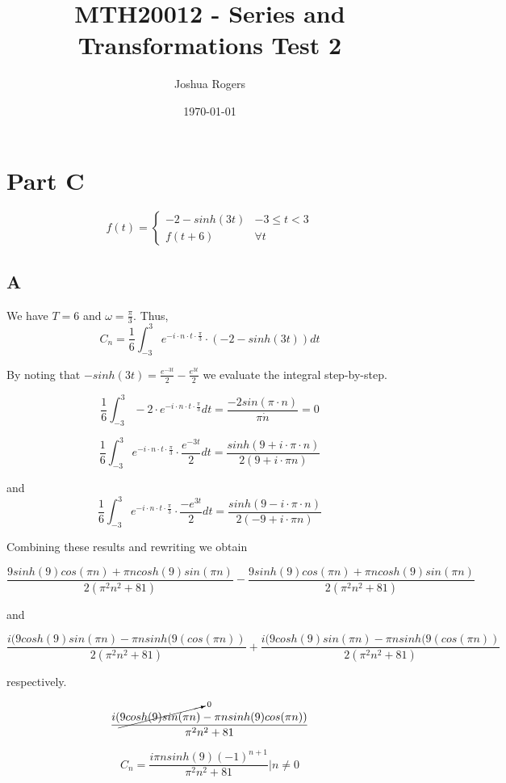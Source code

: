 \documentclass{article}
\title{\vspace{-4cm}MTH20012 - Series and Transformations Test 2}
\author{Joshua Rogers}
\date\today
\begin{document}
\maketitle 

\section*{Part C}


\[ f(t) = \begin{cases}
      -2 - sinh(3t) & -3\leq t < 3 \\
      f(t+6) & \forall t
   \end{cases}
\]


\subsection*{A}

We have $T=6$ and $\omega = \frac{\pi}{3}$. Thus,
$$C_n = \frac{1}{6} \int_{-3}^{3} e^{-i \cdot n \cdot t \cdot \frac{\pi}{3}} \cdot \left(-2-sinh(3t)\right) dt$$

By noting that $-sinh(3t) = \frac{e^{-3t}}{2} - \frac{e^{3t}}{2}$ we evaluate the integral step-by-step.

$$
\frac{1}{6} \int_{-3}^{3} -2 \cdot e^{-i \cdot n \cdot t \cdot \frac{\pi}{3}} dt = \frac{-2sin(\pi \cdot n)}{\pi \dot n} = 0
$$

$$
\frac{1}{6} \int_{-3}^{3}  e^{-i \cdot n \cdot t \cdot \frac{\pi}{3}} \cdot \frac{e^{-3t}}{2} dt = \frac{sinh(9+i\cdot \pi \cdot n)}{2(9 + i\cdot \pi n)}
$$

and
$$
\frac{1}{6} \int_{-3}^{3}  e^{-i \cdot n \cdot t \cdot \frac{\pi}{3}} \cdot \frac{-e^{3t}}{2} dt = \frac{sinh(9-i\cdot \pi \cdot n)}{2(-9 + i\cdot \pi n)}
$$

Combining these results and rewriting we obtain

$$
\frac{9sinh(9)cos(\pi n)+\pi n cosh(9) sin(\pi n)}{2(\pi^2n^2+81)} - \frac{9sinh(9)cos(\pi n)+\pi n cosh(9) sin(\pi n)}{2(\pi^2n^2+81)}
$$

and

$$
\frac{i(9cosh(9)sin(\pi n) - \pi n sinh(9( cos(\pi n))}{2(\pi^2n^2+81)} + \frac{i(9cosh(9)sin(\pi n) - \pi n sinh(9( cos(\pi n))}{2(\pi^2n^2+81)}
$$

respectively.

$$
\frac{i(\cancelto{0}{9cosh(9)sin(\pi n)} - \pi n sinh(9) cos(\pi n))}{\pi^2n^2+81}
$$

$$
C_n = \frac{i\pi n sinh(9)\left(-1\right)^{n+1}}{\pi^2n^2+81} \Bigr|n \neq 0
$$
\end{document}
